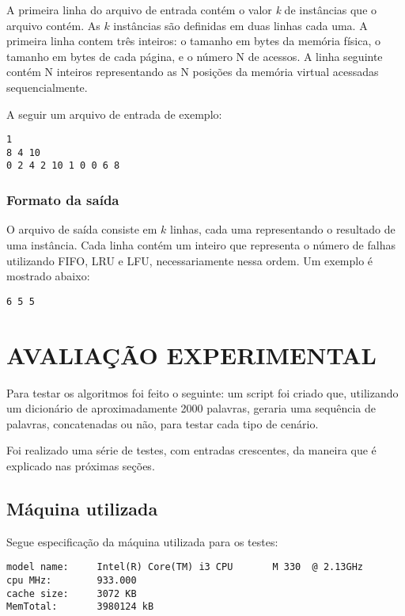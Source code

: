 \documentclass[12pt]{article}
\begin{document}
A primeira linha do arquivo de entrada contém o valor \textit{k} de instâncias que o arquivo contém. As $k$ instâncias são definidas em duas linhas cada uma. A primeira linha contem três inteiros: o tamanho em bytes da memória física, o tamanho em bytes de cada página, e o número N de acessos. A linha seguinte contém N inteiros representando as N posições da memória virtual acessadas sequencialmente.

A seguir um arquivo de entrada de exemplo:

\begin{verbatim}
1
8 4 10
0 2 4 2 10 1 0 0 6 8
\end{verbatim}

\subsubsection{Formato da saída}
\label{saida}

O arquivo de saída consiste em $k$ linhas, cada uma representando o resultado de uma instância. Cada linha contém um inteiro que representa o número de falhas utilizando FIFO, LRU e LFU, necessariamente nessa ordem. Um exemplo é mostrado abaixo:

\begin{verbatim}
6 5 5
\end{verbatim}


\section{AVALIAÇÃO EXPERIMENTAL}
\label{avaliacao_experimental}

Para testar os algoritmos foi feito o seguinte: um script foi criado que, utilizando um dicionário de aproximadamente 2000 palavras, geraria uma sequência de palavras, concatenadas ou não, para testar cada tipo de cenário.

Foi realizado uma série de testes, com entradas crescentes, da maneira que é explicado nas próximas seções.

\subsection{Máquina utilizada}
\label{maquina}

Segue especificação da máquina utilizada para os testes:
\begin{verbatim}
model name:     Intel(R) Core(TM) i3 CPU       M 330  @ 2.13GHz
cpu MHz:        933.000
cache size:     3072 KB
MemTotal:       3980124 kB
\end{verbatim}
\end{document}
